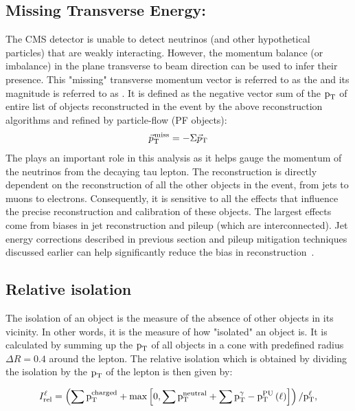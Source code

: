 \subsection{Missing Transverse Energy: \ptvecmiss} 
\label{mt_met_recon}
The CMS detector is unable to detect neutrinos (and other hypothetical particles) that are weakly interacting. However, the momentum balance (or imbalance) in the plane transverse to beam direction can be used to infer their presence. This "missing" transverse momentum vector is referred to as the \ptvecmiss and its magnitude is referred to as \ptmiss. It is defined as the negative vector sum of the $\text{p}_\text{T}$ of entire list of objects reconstructed in the event by the above reconstruction algorithms and refined by particle-flow (PF objects):
\begin{equation}
  {\vec p}_{\mathrm{T}}^{\kern1pt\text{miss}}=-\Sigma{\vec p}_{\mathrm{T}}
\end{equation}
The \ptvecmiss plays an important role in this analysis as it helps gauge the momentum of the neutrinos from the decaying tau lepton. The \ptvecmiss reconstruction is directly dependent on the reconstruction of all the other objects in the event, from jets to muons to electrons. Consequently, it is sensitive to all the effects that influence the precise reconstruction and calibration of these objects. The largest effects come from biases in jet reconstruction and pileup (which are interconnected). Jet energy corrections described in previous section and pileup mitigation techniques discussed earlier can help significantly reduce the bias in \ptvecmiss reconstruction~\cite{Sirunyan:2019kia}. 


\subsection{Relative isolation}
\label{isolation}
The isolation of an object is the measure of the absence of other objects in its vicinity. In other words, it is the measure of how "isolated" an object is. It is calculated by summing up the $\text{p}_\text{T}$ of all objects in a cone with predefined radius $\Delta R=0.4$ around the lepton. The relative isolation which is obtained by dividing the isolation by the $\text{p}_\text{T}$ of the lepton is then given by:

\begin{equation}
I_\text{rel}^{\ell} = \left( \sum  \text{p}_\text{T}^\text{charged} + \text{max}\left[ 0, \sum \text{p}_\text{T}^\text{neutral}
                                 +  \sum \text{p}_\text{T}^{\gamma} - \text{p}_\text{T}^\text{PU}\left(\ell\right)  \right] \right) /  \text{p}_\text{T}^{\ell},
\end{equation}


